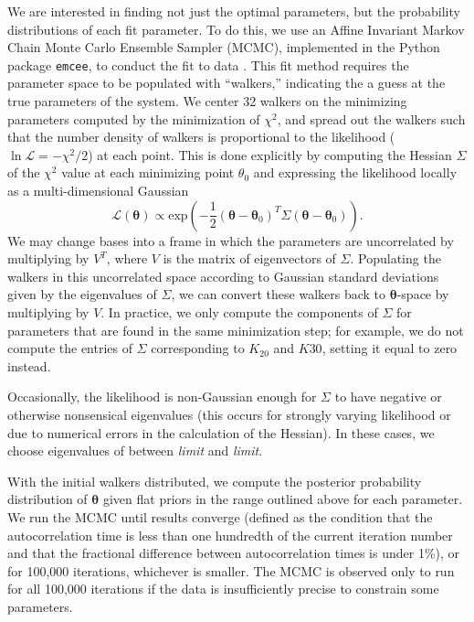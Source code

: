 \documentclass{aastex631}
\newcommand{\parens}[1]{\left( #1 \right)}
\newcommand{\jtd}[1]{{\color{red}\textit{#1}}}
\begin{document}
We are interested in finding not just the optimal parameters, but the probability distributions of each fit parameter. To do this, we use an Affine Invariant Markov Chain Monte Carlo Ensemble Sampler (MCMC), implemented in the Python package \texttt{emcee}, to conduct the fit to data \cite{ForemanMackey2013emceeTM}. This fit method requires the parameter space to be populated with ``walkers,'' indicating the a guess at the true parameters of the system. We center 32 walkers on the minimizing parameters computed by the minimization of $\chi^2$, and spread out the walkers such that the number density of walkers is proportional to the likelihood ($\ln \mathcal{L} = -\chi^2/2$) at each point. This is done explicitly by computing the Hessian $\Sigma$ of the $\chi^2$ value at each minimizing point $\theta_0$ and expressing the likelihood locally as a multi-dimensional Gaussian
\begin{equation}
\mathcal{L}(\bm \theta) \propto \text{exp}\parens{-\frac{1}{2}(\bm \theta-\bm \theta_0)^T \Sigma (\bm \theta-\bm \theta_0)}.
\end{equation}
We may change bases into a frame in which the parameters are uncorrelated by multiplying by $V^T$, where $V$ is the matrix of eigenvectors of $\Sigma$. Populating the walkers in this uncorrelated space according to Gaussian standard deviations given by the eigenvalues of $\Sigma$, we can convert these walkers back to $\bm \theta$-space by multiplying by $V$. In practice, we only compute the components of $\Sigma$ for parameters that are found in the same minimization step; for example, we do not compute the entries of $\Sigma$ corresponding to $K_{20}$ and $K{30}$, setting it equal to zero instead.

Occasionally, the likelihood is non-Gaussian enough for $\Sigma$ to have negative or otherwise nonsensical eigenvalues (this occurs for strongly varying likelihood or due to numerical errors in the calculation of the Hessian). In these cases, we choose eigenvalues of between \jtd{limit} and \jtd{limit}.

With the initial walkers distributed, we compute the posterior probability distribution of $\bm \theta$ given flat priors in the range outlined above for each parameter. We run the MCMC until results converge (defined as the condition that the autocorrelation time is less than one hundredth of the current iteration number and that the fractional difference between autocorrelation times is under 1\%), or for 100,000 iterations, whichever is smaller. The MCMC is observed only to run for all 100,000 iterations if the data is insufficiently precise to constrain some parameters.
\end{document}
